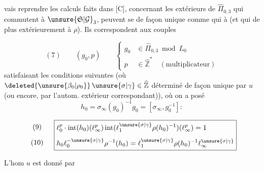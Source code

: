 
 vais reprendre les calculs faits dans [C], concernant les  extérieurs de $\widehat{\Pi}_{0,3}$ qui commutent à $\unsure{\mathfrak S|\mathcal G}_3$,   peuvent se  de façon unique comme    qui  à  (et qui de plus  extérieurement à $\rho$). Ils correspondent  aux couples

\[
(7)\qquad (g_0,p)\qquad
\left\{
\begin{aligned}
g_0&\in\widehat{\Pi}_{0,3}\bmod L_0\\
p&\in\widehat{\mathbb Z}^{*}\quad (\text{multiplicateur})
\end{aligned}
\right.
\]
satisfaisant les conditions suivantes (où $\deleted{\unsure{\beta_0|\rho_0}}\,\unsure{\sigma|\gamma}\in\widehat{\mathbb Z}$   déterminé de façon unique par $u$ (ou encore, par l'autom. extérieur correspondant)), où on a posé
\[
h_0=\sigma_\infty(g_0)^{-1}g_0=[\sigma_\infty,g_0^{-1}]:
\]



\[
\begin{array}{c@{\quad}l}
\begin{array}{c}(9)\\[1em](10)\end{array}
&
\boxed{\begin{aligned}
&\ell_0^p\cdot\operatorname{int}(h_0)(\ell_\infty^p)\operatorname{int}(\ell_1^{\unsure{\sigma|\gamma}}\rho(h_0)^{-1})(\ell_\infty^p)=1\\[.5em]
&h_0\ell_0^{-\unsure{\sigma|\gamma}}\rho^{-1}(h_0)=\ell_1^{\unsure{\sigma|\gamma}}\rho(h_0)^{-1}\ell_\infty^{\unsure{\sigma|\gamma}}
\end{aligned}}
\end{array}
\]

 L'hom $u$ est donné par

